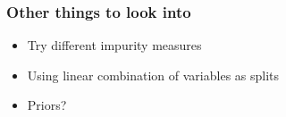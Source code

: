 \documentclass{beamer}
\begin{document}
\begin{frame}
	\frametitle{Other things to look into}
	\begin{itemize}
		\item Try different impurity measures
		\item Using linear combination of variables as splits
		\item Priors?
	\end{itemize}
\end{frame}


\nocite{546466}
\nocite{rpart}
\nocite{cart84}

\frame{
\begin{tiny}


\end{tiny}
}
\end{document}
